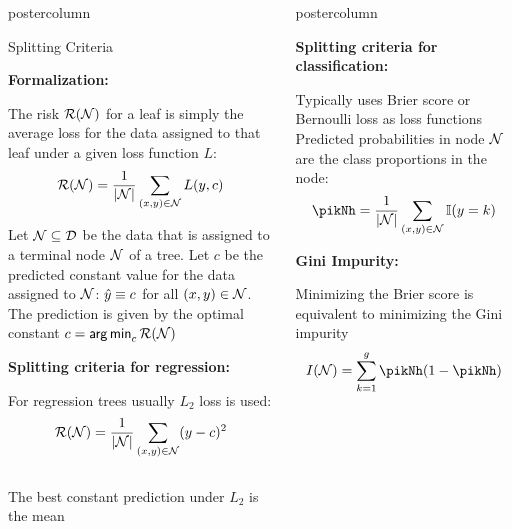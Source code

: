 \documentclass{beamer}
\newlength{\columnheight} %
\begin{document}
\begin{frame}[fragile]{}
\begin{columns}
\begin{column}{.31\textwidth}
\begin{beamercolorbox}[center]{postercolumn}
\begin{minipage}{.98\textwidth}
{\begin{myblock}{Splitting Criteria}
					\begin{codebox} \textbf{Formalization: }
					\end{codebox}
					The risk $\mathcal{R}(\mathcal{N})$ for a leaf is simply the average loss for the data assigned to that leaf under a given loss function $L$: $$\mathcal{R}(\mathcal{N}) = \frac{1}{|\mathcal{N}|} \sum\limits_{(x,y) \in \mathcal{N}} L(y, c)$$
					
					Let $\mathcal{N} \subseteq \mathcal{D}$ be the data that is assigned to a terminal node $\mathcal{N}$ of a tree.
					Let $c$ be the predicted constant value for the data assigned to $\mathcal{N}$: $\hat{y} \equiv c$ for all $\left(x,y\right) \in \mathcal{N}$.\\
					The prediction is given by the optimal constant $c = \mathop{\sf arg\,min}_c \mathcal{R}(\mathcal{N})$
					
					\hspace*{1ex}
					\begin{codebox}
		    		 \textbf{Splitting criteria for regression: }\end{codebox}
		    		For regression trees usually $L_2$ loss is used: 
		    		$$\mathcal{R}(\mathcal{N}) = \frac{1}{|\mathcal{N}|} \sum\limits_{(x,y) \in \mathcal{N}} (y - c)^2$$\\
		    		The best constant prediction under $L_2$ is the mean
					\end{myblock}\vfill
				}
			\end{minipage}
		\end{beamercolorbox}
	\end{column}
	\begin{column}{.31\textwidth}
		\begin{beamercolorbox}[center]{postercolumn}
			\begin{minipage}{.98\textwidth}
				\parbox[t][\columnheight]{\textwidth}{
				\begin{myblock}{ }
					\begin{codebox}
					\textbf{Splitting criteria for classification:}
					\end{codebox} Typically uses Brier score or  Bernoulli loss as loss functions
					Predicted probabilities in node $\mathcal{N}$ are the class proportions in the node:
                    $$ \pikNh = \frac{1}{|\Np|} \sum\limits_{(x,y) \in \Np} \I(y = k) $$
                
                \begin{codebox}
					\textbf{Gini Impurity:}
				\end{codebox}
				Minimizing the Brier score is equivalent to minimizing the Gini impurity $$I(\Np) = \sum_{k=1}^g \pikNh(1-\pikNh)$$
				

\end{myblock}}
\end{minipage}
\end{beamercolorbox}
\end{column}
\end{columns}
\end{frame}
\end{document}
